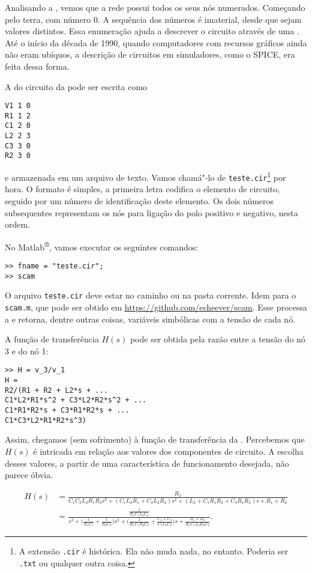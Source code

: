 Analisando a , vemos que a rede possui todos os seus nós numerados. Começando pelo terra, com número 0. A sequência dos números é imaterial, desde que sejam valores distintos. Essa enumeração ajuda a descrever o circuito através de uma . Até o início da década de 1990, quando computadores com recursos gráficos ainda não eram ubíquos, a descrição de circuitos em simuladores, como o SPICE, era feita dessa forma.

A  do circuito da  pode ser escrita como
\begin{lstlisting}
V1 1 0
R1 1 2
C1 2 0
L2 2 3
C3 3 0
R2 3 0
\end{lstlisting}
e armazenada em um arquivo de texto. Vamos chamá"-lo de \lstinline{teste.cir}\footnote{A extensão \lstinline{.cir} é histórica. Ela não muda nada, no entanto. Poderia ser \lstinline{.txt} ou qualquer outra coisa.} por hora. O formato é simples, a primeira letra codifica o elemento de circuito, seguido por um número de identificação deste elemento. Os dois números subsequentes representam os nós para ligação do polo positivo e negativo, nesta ordem.

No Matlab\textsuperscript{®}, vamos executar os seguintes comandos:
\begin{lstlisting}
>> fname = "teste.cir";
>> scam
\end{lstlisting}

O arquivo \lstinline{teste.cir} deve estar no caminho ou na pasta corrente. Idem para o  \lstinline{scam.m}, que pode ser obtido em \url{https://github.com/echeever/scam}. Esse  processa a  e retorna, dentre outras coisas, variáveis simbólicas com a tensão de cada nó.

A função de transferência $H(s)$ pode ser obtida pela razão entre a tensão do nó 3 e do nó 1:
\begin{lstlisting}
>> H = v_3/v_1
H =
R2/(R1 + R2 + L2*s + ...
C1*L2*R1*s^2 + C3*L2*R2*s^2 + ...
C1*R1*R2*s + C3*R1*R2*s + ...
C1*C3*L2*R1*R2*s^3)
\end{lstlisting}

Assim, chegamos (sem sofrimento) à função de transferência da . Percebemos que $H(s)$ é intricada em relação aos valores dos componentes de circuito. A escolha desses valores, a partir de uma característica de funcionamento desejada, não parece óbvia.

\begin{figure*}[tb]
\begin{equation}\begin{aligned}\label{eq:pi}
	H(s)&=\frac{R_2}{C_1C_3L_2R_1R_2s^3+(C_1L_2R_1+C_3L_2R_2)s^2+(L_2+C_1R_1R_2+C_3R_1R_2)s+R_1+R_2}\\
		&=\frac{\displaystyle\frac{1}{R_1C_1L_2C_3}}{\displaystyle s^3+\Big(\frac{1}{R_1C_1}+\frac{1}{R_2C_3}\Big)s^2+\Big(\frac{1}{R_1C_1R_2C_3}+\frac{C_1+C_3}{C_1L_2C_3}\Big)s+\frac{R_1+R_2}{R_1C_1L_2R_2C_3}}.
\end{aligned}\end{equation}
\end{figure*}

